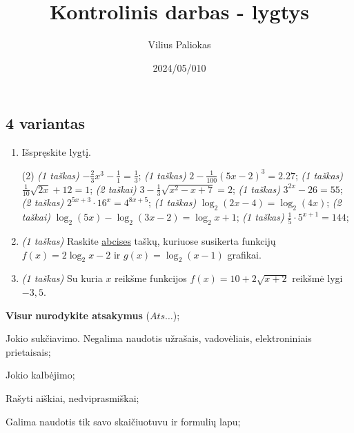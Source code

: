 \documentclass[a4paper]{article}
\title{Kontrolinis darbas - lygtys}
\author{Vilius Paliokas}
\date{2024/05/010}
\begin{document}
\thispagestyle{fancy}

\titlespacing*{\subsection}{0pt}{.75ex}{0.75ex}

\subsection*{4 variantas}

\begin{enumerate}
      \item Išspręskite lygtį.
            \begin{tasks}[item-format={\normalfont}, after-item-skip=2mm](2)
                  \task \textit{(1 taškas)} $-\frac{2}{3}x^3-\frac{1}{1}=\frac{1}{3}$;
                  \task \textit{(1 taškas)} $2-\frac{1}{100}\left(5x-2\right)^3=2.27$;
                  \task \textit{(1 taškas)} $\frac{1}{10}\sqrt{2x}+12=1$;
                  \task \textit{(2 taškai)} $3-\frac{1}{3}\sqrt{x^2-x+7}=2$;
                  \task \textit{(1 taškas)} $3^{2x}-26=55$;
                  \task \textit{(2 taškas)} $2^{5x+3}\cdot16^{x}=4^{8x+5}$;
                  \task \textit{(1 taškas)} $\log_2(2x-4)=\log_2(4x)$;
                  \task \textit{(2 taškai)} $\log_2(5x)-\log_2(3x-2)=\log_2x+1$;
                  \task \textit{(1 taškas)} $\frac{1}{5}\cdot 5^{x+1}=144$;
            \end{tasks}

      \item \textit{(1 taškas)} Raskite \underline{abcises} taškų, kuriuose susikerta funkcijų $f(x)=2\log _2x-2$ ir $g(x)=\log _2\left(x-1\right)$ grafikai.
      \item \textit{(1 taškas)} Su kuria $x$ reikšme funkcijos $f(x)=10+2\sqrt{x+2}$ reikšmė lygi $-3,5$.
\end{enumerate}

\begin{small}
      \begin{enumerate*}[label={(\arabic*)}]
            \item \textbf{Visur} \textbf{nurodykite atsakymus} ($Ats\ldots$);
            \item Jokio sukčiavimo. Negalima naudotis užrašais, vadovėliais,
            elektroniniais prietaisais;
            \item Jokio kalbėjimo;
            \item Rašyti aiškiai, nedviprasmiškai;
            \item Galima naudotis tik savo skaičiuotuvu ir formulių lapu;
      \end{enumerate*}
\end{small}

\vspace*{12mm}


\vspace*{12mm}
\end{document}
